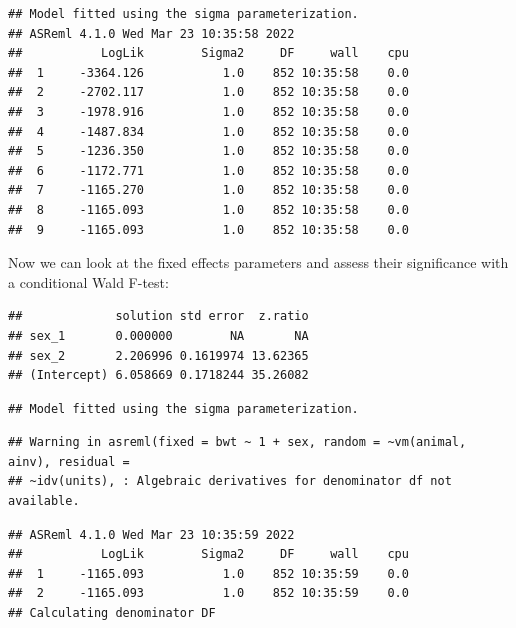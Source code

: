 \documentclass[
  12pt,
]{book}
\newenvironment{Shaded}{\begin{snugshade}}{\end{snugshade}}
\newcommand{\DataTypeTok}[1]{\textcolor[rgb]{0.13,0.29,0.53}{#1}}
\newcommand{\KeywordTok}[1]{\textcolor[rgb]{0.13,0.29,0.53}{\textbf{#1}}}
\newcommand{\NormalTok}[1]{#1}
\newcommand{\OperatorTok}[1]{\textcolor[rgb]{0.81,0.36,0.00}{\textbf{#1}}}
\newcommand{\OtherTok}[1]{\textcolor[rgb]{0.56,0.35,0.01}{#1}}
\newcommand{\StringTok}[1]{\textcolor[rgb]{0.31,0.60,0.02}{#1}}
\begin{document}
\begin{verbatim}
## Model fitted using the sigma parameterization.
## ASReml 4.1.0 Wed Mar 23 10:35:58 2022
##           LogLik        Sigma2     DF     wall    cpu
##  1     -3364.126           1.0    852 10:35:58    0.0
##  2     -2702.117           1.0    852 10:35:58    0.0
##  3     -1978.916           1.0    852 10:35:58    0.0
##  4     -1487.834           1.0    852 10:35:58    0.0
##  5     -1236.350           1.0    852 10:35:58    0.0
##  6     -1172.771           1.0    852 10:35:58    0.0
##  7     -1165.270           1.0    852 10:35:58    0.0
##  8     -1165.093           1.0    852 10:35:58    0.0
##  9     -1165.093           1.0    852 10:35:58    0.0
\end{verbatim}

Now we can look at the fixed effects parameters and assess their significance with a conditional Wald F-test:

\begin{Shaded}
\end{Shaded}

\begin{verbatim}
##             solution std error  z.ratio
## sex_1       0.000000        NA       NA
## sex_2       2.206996 0.1619974 13.62365
## (Intercept) 6.058669 0.1718244 35.26082
\end{verbatim}

\begin{verbatim}
## Model fitted using the sigma parameterization.
\end{verbatim}

\begin{verbatim}
## Warning in asreml(fixed = bwt ~ 1 + sex, random = ~vm(animal, ainv), residual =
## ~idv(units), : Algebraic derivatives for denominator df not available.
\end{verbatim}

\begin{verbatim}
## ASReml 4.1.0 Wed Mar 23 10:35:59 2022
##           LogLik        Sigma2     DF     wall    cpu
##  1     -1165.093           1.0    852 10:35:59    0.0
##  2     -1165.093           1.0    852 10:35:59    0.0
## Calculating denominator DF
\end{verbatim}
\end{document}
